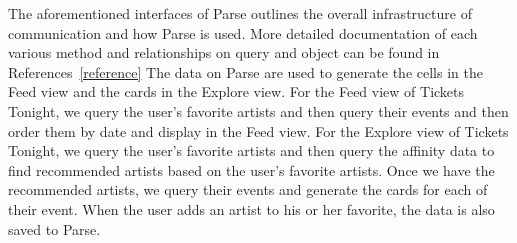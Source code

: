	    The aforementioned interfaces of Parse outlines the overall infrastructure of communication and how Parse is used. More detailed 
	    documentation of each various method and relationships on query and object can be found in References~\ref{reference}
	    The data on Parse are used to generate the cells in the Feed view and the cards in the Explore view. For the Feed view of Tickets Tonight, 
	    we query the user’s favorite artists and then query their events and then order them by date and display in the Feed view. For the Explore 
	    view of Tickets Tonight, we query the user’s favorite artists and then query the affinity data to find recommended artists based on the 
	    user’s favorite artists. Once we have the recommended artists, we query their events and generate the cards for each of their event. When 
	    the user adds an artist to his or her favorite, the data is also saved to Parse. 
	  
